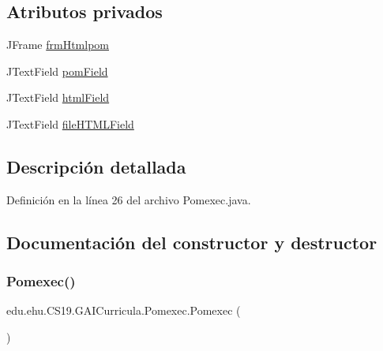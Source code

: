 \subsection*{Atributos privados}
\begin{DoxyCompactItemize}
\item 
J\+Frame \mbox{\hyperlink{classedu_1_1ehu_1_1_c_s19_1_1_g_a_i_curricula_1_1_pomexec_a1927e599316cd24b73c1148e28cb0532}{frm\+Htmlpom}}
\item 
J\+Text\+Field \mbox{\hyperlink{classedu_1_1ehu_1_1_c_s19_1_1_g_a_i_curricula_1_1_pomexec_a7ea71ef0b61fa8df0b1689d11ce167cf}{pom\+Field}}
\item 
J\+Text\+Field \mbox{\hyperlink{classedu_1_1ehu_1_1_c_s19_1_1_g_a_i_curricula_1_1_pomexec_a70bdb1d4b3b75dab759706ce0d85c9cf}{html\+Field}}
\item 
J\+Text\+Field \mbox{\hyperlink{classedu_1_1ehu_1_1_c_s19_1_1_g_a_i_curricula_1_1_pomexec_ac458a48643144b5728bb22fdace1dada}{file\+H\+T\+M\+L\+Field}}
\end{DoxyCompactItemize}


\subsection{Descripción detallada}


Definición en la línea 26 del archivo Pomexec.\+java.



\subsection{Documentación del constructor y destructor}
\mbox{\label{classedu_1_1ehu_1_1_c_s19_1_1_g_a_i_curricula_1_1_pomexec_a8de2bd06d0893d4f24ef2bd8216467cf}} 
\subsubsection{\texorpdfstring{Pomexec()}{Pomexec()}}
{\footnotesize\ttfamily edu.\+ehu.\+C\+S19.\+G\+A\+I\+Curricula.\+Pomexec.\+Pomexec (\begin{DoxyParamCaption}{ }\end{DoxyParamCaption})}



